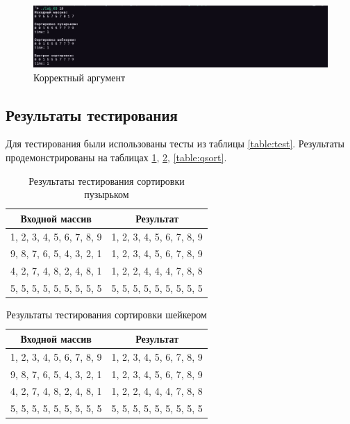 \documentclass[a4paper,12pt]{article}
\begin{document}
\begin{figure}[H]
    \centering
    \includegraphics[scale=0.4]{normal}
    \caption{Корректный аргумент}
    \label{img:normal}
\end{figure}

\subsection{Результаты тестирования}

Для тестирования были использованы тесты из таблицы \ref{table:test}.
Результаты продемонстрированы на таблицах \ref{table:bubble}, \ref{table:shaker},
\ref{table:qsort}.

\begin{table}[H]
    \centering
    \caption{Результаты тестирования сортировки пузырьком}
    \label{table:bubble}
    \begin{tabular}{|c|c|}
        \hline
        Входной массив & Результат \\
        \hline
        1, 2, 3, 4, 5, 6, 7, 8, 9 & 1, 2, 3, 4, 5, 6, 7, 8, 9 \\
        \hline
        9, 8, 7, 6, 5, 4, 3, 2, 1 & 1, 2, 3, 4, 5, 6, 7, 8, 9 \\
        \hline
        4, 2, 7, 4, 8, 2, 4, 8, 1 & 1, 2, 2, 4, 4, 4, 7, 8, 8 \\
        \hline
        5, 5, 5, 5, 5, 5, 5, 5, 5 & 5, 5, 5, 5, 5, 5, 5, 5, 5 \\
        \hline
    \end{tabular}
\end{table}

\begin{table}[H]
    \centering
    \caption{Результаты тестирования сортировки шейкером}
    \label{table:shaker}
    \begin{tabular}{|c|c|}
        \hline
        Входной массив & Результат \\
        \hline
        1, 2, 3, 4, 5, 6, 7, 8, 9 & 1, 2, 3, 4, 5, 6, 7, 8, 9 \\
        \hline
        9, 8, 7, 6, 5, 4, 3, 2, 1 & 1, 2, 3, 4, 5, 6, 7, 8, 9 \\
        \hline
        4, 2, 7, 4, 8, 2, 4, 8, 1 & 1, 2, 2, 4, 4, 4, 7, 8, 8 \\
        \hline
        5, 5, 5, 5, 5, 5, 5, 5, 5 & 5, 5, 5, 5, 5, 5, 5, 5, 5 \\
        \hline
    \end{tabular}
\end{table}
\end{document}
